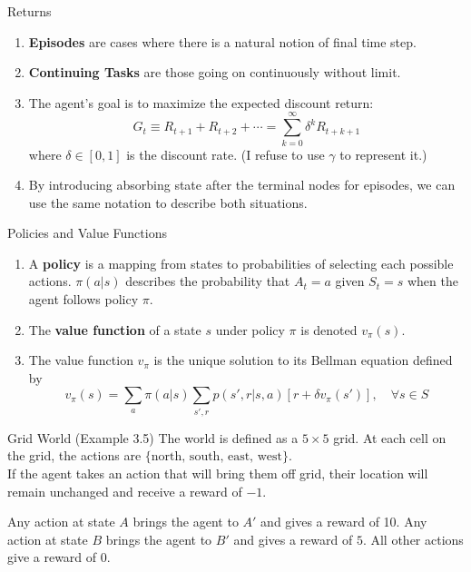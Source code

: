 \documentclass{beamer}
\begin{document}
\begin{frame}{Returns}
    \begin{enumerate}
        \item \textbf{Episodes} are cases where there is a natural notion of final time step.
        \item \textbf{Continuing Tasks} are those going on continuously without limit.
        \item The agent's goal is to maximize the expected discount return:
        \[
        G_t \equiv R_{t+1} + R_{t+2} + \cdots = \sum_{k=0}^\infty \delta^k R_{t+k+1}
        \]
        where $\delta\in[0,1]$ is the discount rate. (I refuse to use $\gamma$ to represent it.)

        \item By introducing absorbing state after the terminal nodes for episodes, we can use the same notation to describe both situations.
    \end{enumerate}
\end{frame}

\begin{frame}{Policies and Value Functions}
\begin{enumerate}
    \item A \textbf{policy} is a mapping from states to probabilities of selecting each possible actions. $\pi(a|s)$ describes the probability that $A_t = a$ given $S_t=s$ when the agent follows policy $\pi$.
    \item The \textbf{value function} of a state $s$ under policy $\pi$ is denoted $v_\pi(s)$.
    \item The value function $v_\pi$ is the unique solution to its Bellman equation defined by 
    \[
    v_\pi(s) = \sum_a \pi(a|s) \sum_{s',r}p(s',r|s,a)[r+\delta v_\pi(s')],\quad \forall s\in S
    \]
\end{enumerate}
\end{frame}

\begin{frame}{Grid World (Example 3.5)}
The world is defined as a $5\times 5$ grid. At each cell on the grid, the actions are $\{\text{north, south, east, west}\}$.\\

If the agent takes an action that will bring them off grid, their location will remain unchanged and receive a reward of $-1$.

Any action at state $A$ brings the agent to $A'$ and gives a reward of 10. Any action at state $B$ brings the agent to $B'$ and gives a reward of $5$. All other actions give a reward of 0.
\end{frame}
\end{document}
